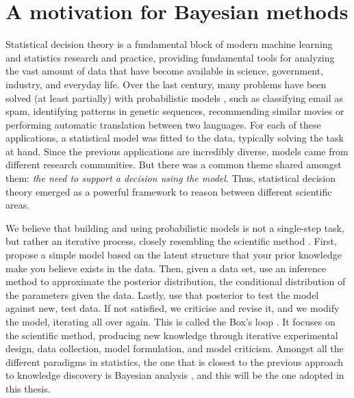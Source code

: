 
\section{A motivation for Bayesian methods}

Statistical decision theory \parencite{french} is a fundamental block of modern machine learning and statistics research and practice,
providing fundamental tools for analyzing the vast amount of data that have become available in science, government, industry, and everyday life. Over the last century, many problems have been solved (at least partially) with probabilistic models \parencite{bishop2006pattern}, such as classifying email as spam, identifying patterns in genetic sequences, recommending similar movies or performing automatic translation between two languages. For each of these applications, a statistical model was fitted to the data, typically solving the task at hand. Since the previous applications are incredibly diverse,  models came from  different research communities. But there was a common theme shared amongst them: \emph{the need to support a decision using the model}. Thus, statistical decision theory  emerged as a powerful framework to reason between different scientific areas. 

We believe that building and using probabilistic models is not a single-step task, but rather an iterative process, closely resembling the scientific method \parencite{conant1959understanding}. First, propose a simple model based on the latent structure that your prior knowledge make you believe exists in the data. Then, given a data set, use an inference
method to approximate the posterior distribution, the conditional distribution of the  parameters
given the data. Lastly,
use that posterior to test the model against new, test data. If not satisfied, we criticise and revise it, and we modify the model, iterating all over again. This is called the Box's loop \parencite{doi:10.1080/00401706.1962.10490015,10.2307/1266125}. It focuses on the scientific method, producing new knowledge  through iterative experimental design, data collection,
model formulation, and model criticism.
Amongst all the different paradigms in statistics, the one that is closest to the previous approach to knowledge discovery is Bayesian analysis \parencite{gelman2013bayesian,insua2012bayesian}, and this will be the one adopted in this thesis.


